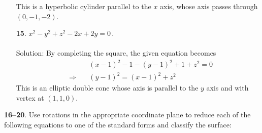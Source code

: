 \documentclass[12pt]{amsbook}
\begin{document}
\begin{enumerate}
This is a hyperbolic cylinder parallel to the $x$ axis, whose axis passes through $(0,-1,-2)$. 
\\
\item[{\small\bf 15}.]\quad  $x^2-y^2+z^2-2x+2y=0\,.$
\\
\\
{\sc Solution}:
By completing the square, the given equation becomes
\begin{eqnarray*}
&&\quad (x-1)^2-1-(y-1)^2+1+z^2=0\\
&\Rightarrow&\quad
(y-1)^2=(x-1)^2+z^2
\end{eqnarray*}
This is an elliptic double cone whose axis is parallel to the $y$ axis and with vertex at $(1,1,0)$. 
\\
 \end{enumerate} 
{\small\bf 16--20}. Use rotations in the appropriate coordinate 
plane to reduce each of the following equations
to one of the standard forms and classify the surface:
\end{document}
